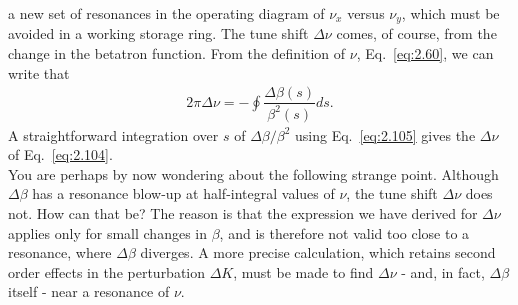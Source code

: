  a new set of resonances in the operating diagram of $\nu_x$ versus $\nu_y$, which must be avoided in a working storage ring.
The tune shift $\Delta\nu$ comes, of course, from the change in the betatron function. From the definition of $\nu$, Eq.~\eqref{eq:2.60}, we can write that
\begin{align}
	2\pi\Delta\nu = -\oint \dfrac{\Delta\beta(s)}{\beta^2(s)}ds.
\end{align}
A straightforward integration over $s$ of $\Delta\beta/\beta^2$ using Eq.~\eqref{eq:2.105} gives the $\Delta\nu$ of Eq.~\eqref{eq:2.104}.\\
You are perhaps by now wondering about the following strange point. Although $\Delta\beta$ has a resonance blow-up at half-integral values of $\nu$, the tune shift $\Delta\nu$ does not. How can that be? The reason is that the expression we have derived for $\Delta\nu$ applies only for small changes in $\beta$, and is therefore not valid too close to a resonance, where $\Delta\beta$ diverges. A more precise calculation, which retains second order effects in the perturbation $\Delta K$, must be made to find $\Delta\nu$ - and, in fact, $\Delta\beta$ itself - near a resonance of $\nu$.
